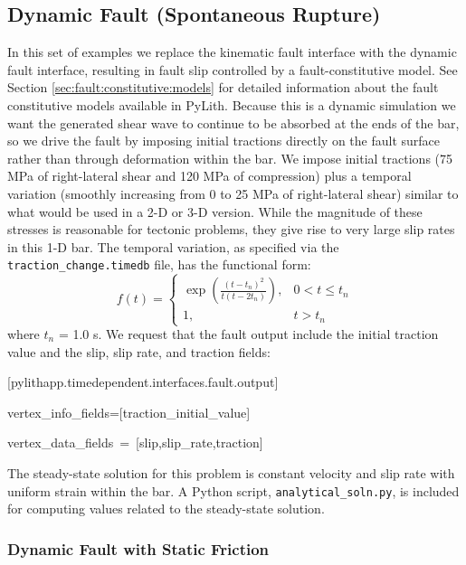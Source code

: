 \subsection{Dynamic Fault (Spontaneous Rupture)}

In this set of examples we replace the kinematic fault interface with
the dynamic fault interface, resulting in fault slip controlled by
a fault-constitutive model. See Section \ref{sec:fault:constitutive:models}
for detailed information about the fault constitutive models available
in PyLith. Because this is a dynamic simulation we want the generated
shear wave to continue to be absorbed at the ends of the bar, so we
drive the fault by imposing initial tractions directly on the fault
surface rather than through deformation within the bar. We impose
initial tractions (75 MPa of right-lateral shear and 120 MPa of compression)
plus a temporal variation (smoothly increasing from 0 to 25 MPa of
right-lateral shear) similar to what would be used in a 2-D or 3-D
version. While the magnitude of these stresses is reasonable for tectonic
problems, they give rise to very large slip rates in this 1-D bar.
The temporal variation, as specified via the \texttt{traction\_change.timedb}
file, has the functional form:
\begin{equation}
f(t)=\begin{cases}
\exp\left(\frac{\left(t-t_{n}\right)^{2}}{t\left(t-2t_{n}\right)}\right), & 0<t\le t_{n}\\
1, & t>t_{n}
\end{cases}
\end{equation}
where $t_{n}$ = 1.0 s. We request that the fault output include the
initial traction value and the slip, slip rate, and traction fields:
\begin{lyxcode}
{[}pylithapp.timedependent.interfaces.fault.output{]}

vertex\_info\_fields={[}traction\_initial\_value{]}

vertex\_data\_fields~=~{[}slip,slip\_rate,traction{]}
\end{lyxcode}
The steady-state solution for this problem is constant velocity and
slip rate with uniform strain within the bar. A Python script, \texttt{analytical\_soln.py},
is included for computing values related to the steady-state solution.


\subsubsection{Dynamic Fault with Static Friction}

